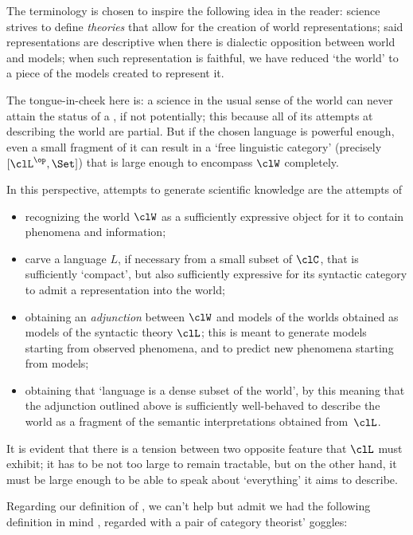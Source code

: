\begin{remark}\label{remark_yuggoth_2}
  The terminology is chosen to inspire the following idea in the reader: science strives to define \emph{theories} that allow for the creation of world representations; said representations are descriptive when there is dialectic opposition between world and models; when such representation is faithful, we have reduced `the world' to a piece of the models created to represent it.

  The tongue-in-cheek here is: a science in the usual sense of the world can never attain the status of a \science, if not potentially; this because all of its attempts at describing the world are partial. But if the chosen language is powerful enough, even a small fragment of it can result in a `free linguistic category' (precisely $[\clL^\op,\Set]$) that is large enough to encompass $\clW$ completely.
  
  In this perspective, attempts to generate scientific knowledge are the attempts of
  \begin{itemize}
    \item recognizing the world $\clW$ as a sufficiently expressive object for it to contain phenomena and information;
    \item carve a language $L$, if necessary from a small subset of $\clC$, that is sufficiently `compact', but also sufficiently expressive for its syntactic category to admit a representation into the world;
    \item obtaining an \emph{adjunction} between $\clW$ and models of the worlds obtained as models of the syntactic theory $\clL$; this is meant to generate models starting from observed phenomena, and to predict new phenomena starting from models;
    \item obtaining that `language is a dense subset of the world', by this meaning that the adjunction outlined above is sufficiently well-behaved to describe the world as a fragment of the semantic interpretations obtained from~$\clL$.
  \end{itemize}
  It is evident that there is a tension between two opposite feature that $\clL$ must exhibit; it has to be not too large to remain tractable, but on the other hand, it must be large enough to be able to speak about `everything' it aims to describe.
\end{remark}
Regarding our definition of \science, we can't help but admit we had the following definition in mind \cite[2.1]{biologia}, regarded with a pair of category theorist' goggles:

